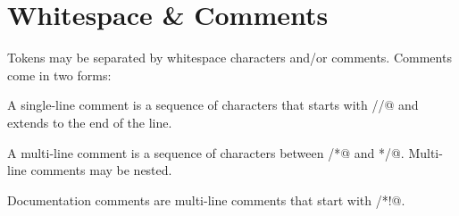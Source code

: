 \section{Whitespace \& Comments}\label{sec:whitespacecomments}

Tokens may be separated by whitespace characters and/or comments. Comments come in two forms: 

A single-line comment is a sequence of characters that starts with \lstinline@//@ and extends to the end of the line. 

A multi-line comment is a sequence of characters between \lstinline@/*@ and \lstinline@*/@. Multi-line comments may be nested. 

Documentation comments are multi-line comments that start with \lstinline@/*!@. 





